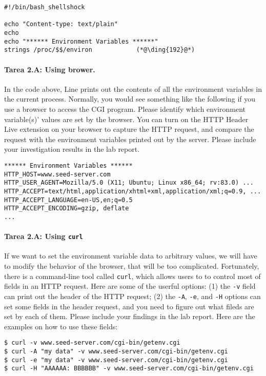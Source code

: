 \begin{lstlisting}[caption=\texttt{getenv.cgi}]
#!/bin/bash_shellshock             

echo "Content-type: text/plain"
echo
echo "****** Environment Variables ******"
strings /proc/$$/environ            (*@\ding{192}@*)
\end{lstlisting}

\paragraph{Tarea 2.A: Using brower.}
In the code above, Line  prints out the contents of all the
environment variables in the current process. Normally, you would see something 
like the following if you use a browser to access the CGI program. Please 
identify which environment variable(s)' values are set by the browser.
You can turn on the HTTP Header Live extension on your browser to 
capture the HTTP request, and compare the request with the 
environment variables printed out by the server. Please include your 
investigation results in the lab report.

\begin{lstlisting}
****** Environment Variables ******
HTTP_HOST=www.seed-server.com
HTTP_USER_AGENT=Mozilla/5.0 (X11; Ubuntu; Linux x86_64; rv:83.0) ...
HTTP_ACCEPT=text/html,application/xhtml+xml,application/xml;q=0.9, ...
HTTP_ACCEPT_LANGUAGE=en-US,en;q=0.5
HTTP_ACCEPT_ENCODING=gzip, deflate
...
\end{lstlisting}

 
\paragraph{Tarea 2.A: Using \texttt{curl}}
If we want to set the environment variable data to arbitrary values,
we will have to modify the behavior of the browser, that will be too complicated. 
Fortunately, there is a command-line tool called \texttt{curl}, which allows 
users to to control most of fields in an HTTP request. Here are some 
of the userful options: (1) the \texttt{-v} field can print out the header 
of the HTTP request; (2) the \texttt{-A}, \texttt{-e}, and 
\texttt{-H} options can set some fields in the header request, and
you need to figure out what fileds are set by each of them. 
Please include your findings in the lab report. 
Here are the examples on how to use these fields:
 

\begin{lstlisting}
$ curl -v www.seed-server.com/cgi-bin/getenv.cgi
$ curl -A "my data" -v www.seed-server.com/cgi-bin/getenv.cgi
$ curl -e "my data" -v www.seed-server.com/cgi-bin/getenv.cgi
$ curl -H "AAAAAA: BBBBBB" -v www.seed-server.com/cgi-bin/getenv.cgi
\end{lstlisting}
 
